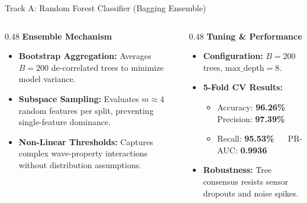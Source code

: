 \documentclass[aspectratio=169,11pt]{beamer}
\begin{document}
\begin{frame}{Track A: Random Forest Classifier (Bagging Ensemble)}
  \vspace*{0.05cm}

  \centering

  \vspace*{0.12cm}
  \begin{columns}[T,onlytextwidth]
    \begin{column}{0.48\textwidth}
      \textbf{\small\color{navy} Ensemble Mechanism}
      \vspace*{0.08cm}
      \begin{itemize}\setlength{\itemsep}{0.25em}\footnotesize
        \item \textbf{Bootstrap Aggregation:} Averages $B = 200$ de-correlated trees to minimize model variance.
        \item \textbf{Subspace Sampling:} Evaluates $m \approx 4$ random features per split, preventing single-feature dominance.
        \item \textbf{Non-Linear Thresholds:} Captures complex wave-property interactions without distribution assumptions.
      \end{itemize}
    \end{column}
    \hfill
    \begin{column}{0.48\textwidth}
      \textbf{\small\color{blastred} Tuning \& Performance}
      \vspace*{0.08cm}
      \begin{itemize}\setlength{\itemsep}{0.25em}\footnotesize
        \item \textbf{Configuration:} $B = 200$ trees, $\text{max\_depth} = 8$.
        \item \textbf{5-Fold CV Results:}
          \begin{itemize}\scriptsize
            \item Accuracy: \textbf{96.26\%} $\quad$ Precision: \textbf{97.39\%}
            \item Recall: \textbf{95.53\%} $\quad$ PR-AUC: \textbf{0.9936}
          \end{itemize}
        \item \textbf{Robustness:} Tree consensus resists sensor dropouts and noise spikes.
      \end{itemize}
    \end{column}
  \end{columns}
\end{frame}
\end{document}

